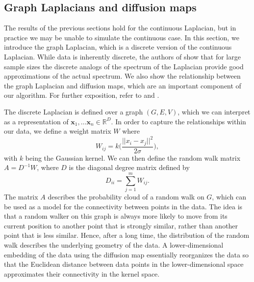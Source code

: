 \documentclass{article}
\numberwithin{equation}{section}
\theoremstyle{definition}
\begin{document}
\subsection{Graph Laplacians and diffusion maps}
The results of the previous sections hold for the continuous Laplacian, but in practice we may be unable to simulate the continuous case. In this section, we introduce the graph Laplacian, which is a discrete version of the continuous Laplacian. While data is inherently discrete, the authors of \cite{Nadler_2006} show that for large sample sizes the discrete analogs of the spectrum of the Laplacian provide good approximations of the actual spectrum. We also show the relationship between the graph Laplacian and diffusion maps, which are an important component of our algorithm. For further exposition, refer to \cite{coifman2006diffusion} and \cite{Belkin_2003}.

The discrete Laplacian is defined over a graph $(G,E,V)$, which we can interpret as a representation of $\mathbf{x}_1, \ldots \mathbf{x}_n \in \mathbb{R}^D$. In order to capture the relationships within our data, we define a weight matrix $W$ where
\begin{equation}
W_{ij} = k\bigg(\frac{||x_i-x_j||^2}{2\sigma}\bigg),
\end{equation}
with $k$ being the Gaussian kernel. We can then define the random walk matrix $A = D^{-1}W$, where $D$ is the diagonal degree matrix defined by
\begin{equation}\label{degree_matrix}
D_{ii} = \sum_{j=1}^m W_{ij}.
\end{equation}
The matrix $A$ describes the probability cloud of a random walk on $G$, which can be used as a model for the connectivity between points in the data. The idea is that a random walker on this graph is always more likely to move from its current position to another point that is strongly similar, rather than another point that is less similar. Hence, after a long time, the distribution of the random walk describes the underlying geometry of the data. A lower-dimensional embedding of the data using the diffusion map essentially reorganizes the data so that the Euclidean distance between data points in the lower-dimensional space approximates their connectivity in the kernel space.
\end{document}
